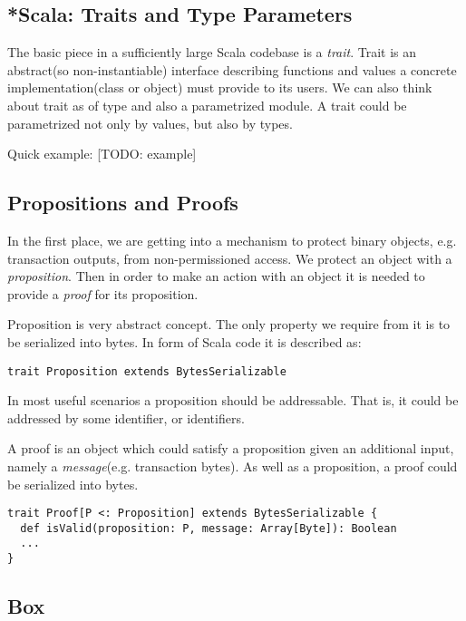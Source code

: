 \documentclass[]{report}   %
\begin{document}
\subsection{*Scala: Traits and Type Parameters}

The basic piece in a sufficiently large Scala codebase is a \textit{trait}. Trait is an abstract(so non-instantiable) interface describing functions and values a concrete implementation(class or object) must provide to its users. We can also think about trait as of type and also a parametrized module. A trait could be parametrized not only by values, but also by types. 

Quick example: 
[TODO: example]

\subsection{Propositions and Proofs}

In the first place, we are getting into a mechanism to protect binary objects, e.g. transaction outputs, from non-permissioned access. We protect an object with a \textit{proposition}. Then in order to make an action with an object it is needed to provide a \textit{proof} for its proposition. 

Proposition is very abstract concept. The only property we require from it is to be serialized into bytes. In form of Scala code it is described as:

\begin{lstlisting}
trait Proposition extends BytesSerializable
\end{lstlisting}

In most useful scenarios a proposition should be addressable. That is, it could be addressed by some identifier, or identifiers.

A proof is an object which could satisfy a proposition given an additional input, namely a \textit{message}(e.g. transaction bytes). As well as a proposition, a proof could be serialized into bytes. 

\begin{lstlisting}
trait Proof[P <: Proposition] extends BytesSerializable {
  def isValid(proposition: P, message: Array[Byte]): Boolean
  ...
}
\end{lstlisting}


\subsection{Box}
\end{document}
